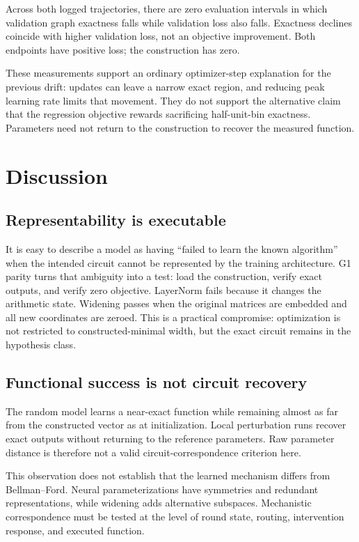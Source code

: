 \documentclass[10pt,twocolumn]{article}
\newcommand{\gparity}{\textsc{G1}}
\begin{document}
Across both logged trajectories, there are zero evaluation intervals in which
validation graph exactness falls while validation loss also falls. Exactness
declines coincide with higher validation loss, not an objective improvement.
Both endpoints have positive loss; the construction has zero.

These measurements support an ordinary optimizer-step explanation for the
previous drift: updates can leave a narrow exact region, and reducing peak
learning rate limits that movement. They do not support the alternative claim
that the regression objective rewards sacrificing half-unit-bin exactness.
Parameters need not return to the construction to recover the measured
function.

\section{Discussion}

\subsection{Representability is executable}

It is easy to describe a model as having ``failed to learn the known
algorithm'' when the intended circuit cannot be represented by the training
architecture. \gparity{} parity turns that ambiguity into a test: load the
construction, verify exact outputs, and verify zero objective. LayerNorm fails
because it changes the arithmetic state. Widening passes when the original
matrices are embedded and all new coordinates are zeroed. This is a practical
compromise: optimization is not restricted to constructed-minimal width, but
the exact circuit remains in the hypothesis class.

\subsection{Functional success is not circuit recovery}

The random model learns a near-exact function while remaining almost as far
from the constructed vector as at initialization. Local perturbation runs
recover exact outputs without returning to the reference parameters. Raw
parameter distance is therefore not a valid circuit-correspondence criterion
here.

This observation does not establish that the learned mechanism differs from
Bellman--Ford. Neural parameterizations have symmetries and redundant
representations, while widening adds alternative subspaces. Mechanistic
correspondence must be tested at the level of round state, routing,
intervention response, and executed function.
\end{document}

